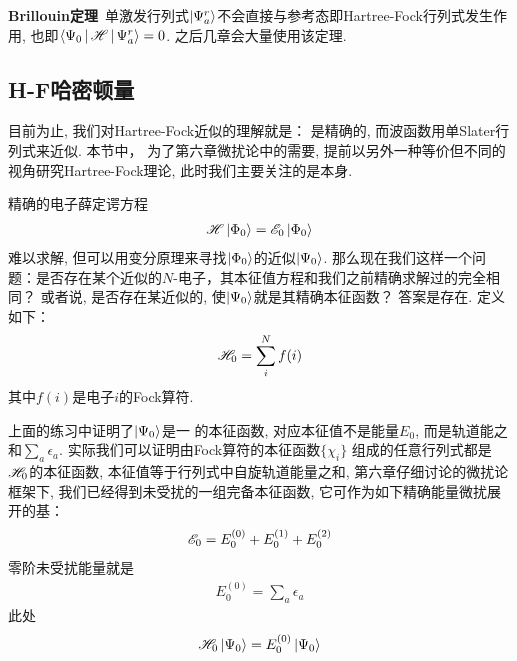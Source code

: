 \textbf{Brillouin定理}\ 单激发行列式$\Ket{\Psi_a^r}$不会直接与参考态即Hartree-Fock行列式发生作用, 也即$\Braket{\Psi_0|\mathscr{H}|\Psi_a^r}=0$. 之后几章会大量使用该定理.
\subsection{H-F哈密顿量}
目前为止, 
我们对Hartree-Fock近似的理解就是： \ha 是精确的, 
而波函数用单Slater行列式来近似. 
本节中，
为了第六章微扰论中的需要, 
提前以另外一种等价但不同的视角研究Hartree-Fock理论, 
此时我们主要关注的是\ha 本身.


精确的电子薛定谔方程
\begin{align}
	\mathscr{H}\Ket{\Phi_0} = \mathscr{E}_0\Ket{\Phi_0}
\end{align}
难以求解, 但可以用变分原理来寻找$\Ket{\Phi_0}$的近似$\Ket{\Psi_0}$. 
那么现在我们这样一个问题：是否存在某个近似的$N$-电子\ha ，其本征值方程和我们之前精确求解过的完全相同？
或者说, 是否存在某近似的\ha, 使$\Ket{\Psi_0}$就是其精确本征函数？
答案是存在. \emph{\hft{} \ha}定义如下：
\begin{align}
	\mathscr{H}_0 = \sum_i^Nf(i)
\end{align}
其中$f(i)是$电子$i$的Fock算符.


上面的练习中证明了$\Ket{\Psi_0}$是一\hft{} \ha 的本征函数, 
对应本征值不是\hft 能量$E_0$, 
而是轨道能之和$\sum_a\epsilon_a$. 
实际我们可以证明由Fock算符的本征函数$\{\chi_i\}$ 组成的任意行列式都是$\mathscr{H}_0$的本征函数, 
本征值等于行列式中自旋轨道能量之和, 
第六章仔细讨论的微扰论框架下, 
我们已经得到未受扰\ha 的一组完备本征函数, 
它可作为如下精确能量微扰展开的基：
\begin{align}
	\label{3.104}
	\mathscr{E}_0 = E_0^{(0)} + E_0^{(1)} + E_0^{(2)}
\end{align}
零阶未受扰能量就是
\begin{align}
	E_0^{(0)} = \sum_a\epsilon_a
\end{align}
此处
\begin{equation}
	\mathscr{H}_0\Ket{\Psi_0}=E_0^{(0)}\Ket{\Psi_0}
\end{equation}

